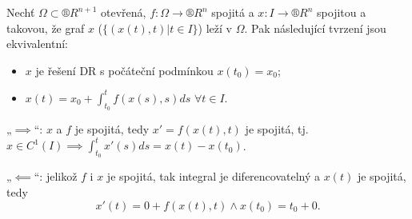 \documentclass[12pt]{article}					%
\begin{document}
\begin{lemma}
	Nechť $\Omega \subset ®R^{n+1}$ otevřená, $f: \Omega \rightarrow ®R^n$ spojitá a $x: I \rightarrow ®R^n$ spojitou a takovou, že graf $x$ ($\{(x(t), t) | t \in I\}$) leží v $\Omega$. Pak následující tvrzení jsou ekvivalentní:

	\begin{itemize}
		\item $x$ je řešení DR s počáteční podmínkou $x(t_0) = x_0$;
		\item $x(t) = x_0 + \int_{t_0}^t f(x(s), s) ds$ $\forall t \in I$.
	\end{itemize}

	\begin{dukazin}
		„$\implies$“: $x$ a $f$ je spojitá, tedy $x' = f(x(t), t)$ je spojitá, tj. $x \in C^1(I) \implies \int_{t_0}^t x'(s) ds = x(t) - x(t_0)$.

		„$\impliedby$“: jelikož $f$ i $x$ je spojitá, tak integral je diferencovatelný a $x(t)$ je spojitá, tedy
		$$ x'(t) = 0 + f(x(t), t) \land x(t_0) = t_0 + 0. $$
	\end{dukazin}
\end{lemma}
\end{document}
